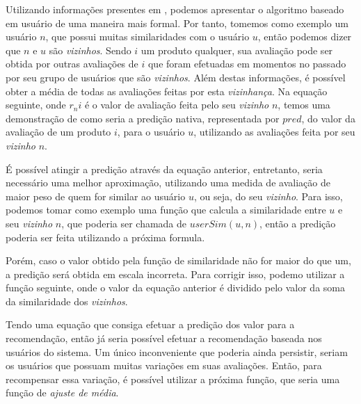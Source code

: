 \documentclass[12pt,
				openright,
				twoside,
				a4paper,
				apter=TITLE,
				section=TITLE,
				subsection=TITLE,
				chapter=TITLE,
				english,
				brazil]{abntex2}
\begin{document}
Utilizando informações presentes em \cite{schafer2007collaborative}, podemos apresentar o algoritmo baseado em usuário de uma maneira mais formal. Por tanto, tomemos como exemplo um usuário $n$, que possui muitas similaridades com o usuário $u$, então podemos dizer que $n$ e $u$ são \textit{vizinhos}. Sendo $i$ um produto qualquer, sua avaliação pode ser obtida por outras avaliações de $i$ que foram efetuadas em momentos no passado por seu grupo de usuários que são \textit{vizinhos}. Além destas informações, é possível obter a média de todas as avaliações feitas por esta \textit{vizinhança}. Na equação seguinte, onde $r_ni$ é o valor de avaliação feita pelo seu \textit{vizinho} $n$, temos uma demonstração de como seria a predição nativa, representada por $pred$, do valor da avaliação de um produto $i$, para o usuário $u$, utilizando as avaliações feita por seu \textit{vizinho} $n$.


É possível atingir a predição através da equação anterior, entretanto, seria necessário uma melhor aproximação, utilizando uma medida de avaliação de maior peso de quem for similar ao usuário $u$, ou seja, do seu \textit{vizinho}. Para isso, podemos tomar como exemplo uma função que calcula a similaridade entre $u$ e seu \textit{vizinho} $n$, que poderia ser chamada de $userSim(u,n)$, então a predição poderia ser feita utilizando a próxima formula. 


Porém, caso o valor obtido pela função de similaridade não for maior do que um, a predição será obtida em escala incorreta. Para corrigir isso, podemo utilizar a função seguinte, onde o valor da equação anterior é dividido pelo valor da soma da similaridade dos \textit{vizinhos}.


Tendo uma equação que consiga efetuar a predição dos valor para a recomendação, então já seria possível efetuar a recomendação baseada nos usuários do sistema. Um único inconveniente que poderia ainda persistir, seriam os usuários que possuam muitas variações em suas avaliações. Então, para recompensar essa variação, é possível utilizar a próxima função, que seria uma função de \textit{ajuste de média}.

\end{document}
